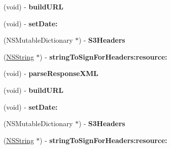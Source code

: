\begin{DoxyCompactItemize}
\item 
\hypertarget{interface_a_s_i_s3_request_ace59aaf9a74564868fc1f426b363e5bb}{
(void) -\/ {\bfseries build\-U\-R\-L}}
\label{interface_a_s_i_s3_request_ace59aaf9a74564868fc1f426b363e5bb}

\item 
\hypertarget{interface_a_s_i_s3_request_a3eb32c464e0663e896f97338e45fcbcc}{
(void) -\/ {\bfseries set\-Date\-:}}
\label{interface_a_s_i_s3_request_a3eb32c464e0663e896f97338e45fcbcc}

\item 
\hypertarget{interface_a_s_i_s3_request_ae9241f3e6890675b37ebcc612a4112b3}{
(\-N\-S\-Mutable\-Dictionary $\ast$) -\/ {\bfseries \-S3\-Headers}}
\label{interface_a_s_i_s3_request_ae9241f3e6890675b37ebcc612a4112b3}

\item 
\hypertarget{interface_a_s_i_s3_request_a6186d54d09b61de7f1929707a983a95b}{
(\hyperlink{class_n_s_string}{\-N\-S\-String} $\ast$) -\/ {\bfseries string\-To\-Sign\-For\-Headers\-:resource\-:}}
\label{interface_a_s_i_s3_request_a6186d54d09b61de7f1929707a983a95b}

\item 
\hypertarget{interface_a_s_i_s3_request_a537b485990a0b0b1cf22d122439b89e1}{
(void) -\/ {\bfseries parse\-Response\-X\-M\-L}}
\label{interface_a_s_i_s3_request_a537b485990a0b0b1cf22d122439b89e1}

\item 
\hypertarget{interface_a_s_i_s3_request_ace59aaf9a74564868fc1f426b363e5bb}{
(void) -\/ {\bfseries build\-U\-R\-L}}
\label{interface_a_s_i_s3_request_ace59aaf9a74564868fc1f426b363e5bb}

\item 
\hypertarget{interface_a_s_i_s3_request_a3eb32c464e0663e896f97338e45fcbcc}{
(void) -\/ {\bfseries set\-Date\-:}}
\label{interface_a_s_i_s3_request_a3eb32c464e0663e896f97338e45fcbcc}

\item 
\hypertarget{interface_a_s_i_s3_request_ae9241f3e6890675b37ebcc612a4112b3}{
(\-N\-S\-Mutable\-Dictionary $\ast$) -\/ {\bfseries \-S3\-Headers}}
\label{interface_a_s_i_s3_request_ae9241f3e6890675b37ebcc612a4112b3}

\item 
\hypertarget{interface_a_s_i_s3_request_a6186d54d09b61de7f1929707a983a95b}{
(\hyperlink{class_n_s_string}{\-N\-S\-String} $\ast$) -\/ {\bfseries string\-To\-Sign\-For\-Headers\-:resource\-:}}
\label{interface_a_s_i_s3_request_a6186d54d09b61de7f1929707a983a95b}


\end{DoxyCompactItemize}
